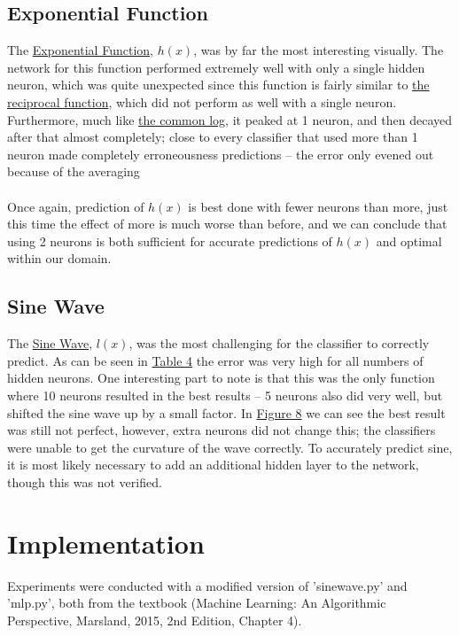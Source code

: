 \documentclass{article}
\begin{document}
	\subsection{Exponential Function}\label{S43}
		The \hyperref[EQ]{Exponential Function}, $h(x)$, was by far the most interesting visually. The network for this function performed extremely well with only a single hidden neuron, which was quite unexpected since this function is fairly similar to \hyperref[S43]{the reciprocal function}, which did not perform as well with a single neuron. Furthermore, much like \hyperref[S43]{the common log}, it peaked at 1 neuron, and then decayed after that almost completely; close to every classifier that used more than 1 neuron made completely erroneousness predictions -- the error only evened out because of the averaging \\
		\\ Once again, prediction of $h(x)$ is best done with fewer neurons than more, just this time the effect of more is much worse than before, and we can conclude that using 2 neurons is both sufficient for accurate predictions of $h(x)$ and optimal within our domain.
		
	\subsection{Sine Wave}\label{S44}
		The \hyperref[EQ]{Sine Wave}, $l(x)$, was the most challenging for the classifier to correctly predict. As can be seen in \hyperref[T4]{Table 4} the error was very high for all numbers of hidden neurons. One interesting part to note is that this was the only function where 10 neurons resulted in the best results -- 5 neurons also did very well, but shifted the sine wave up by a small factor. In \hyperref[F_S_2]{Figure 8} we can see the best result was still not perfect, however, extra neurons did not change this; the classifiers were unable to get the curvature of the wave correctly. To accurately predict sine, it is most likely necessary to add an additional hidden layer to the network, though this was not verified.\\
	
\section{Implementation}\label{S5}
	Experiments were conducted with a modified version of 'sinewave.py' and 'mlp.py', both from the textbook (Machine Learning: An Algorithmic Perspective, Marsland, 2015, 2nd Edition, Chapter 4).
\end{document}
